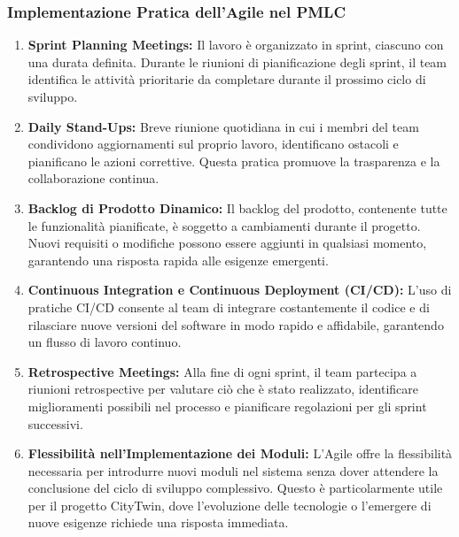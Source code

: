 \subsubsection{Implementazione Pratica dell'Agile nel PMLC}

\begin{enumerate}
    \item \textbf{Sprint Planning Meetings:} Il lavoro è organizzato in sprint, ciascuno con una durata definita. Durante le riunioni di pianificazione degli sprint, il team identifica le attività prioritarie da completare durante il prossimo ciclo di sviluppo.
    
    \item \textbf{Daily Stand-Ups:} Breve riunione quotidiana in cui i membri del team condividono aggiornamenti sul proprio lavoro, identificano ostacoli e pianificano le azioni correttive. Questa pratica promuove la trasparenza e la collaborazione continua.
    
    \item \textbf{Backlog di Prodotto Dinamico:} Il backlog del prodotto, contenente tutte le funzionalità pianificate, è soggetto a cambiamenti durante il progetto. Nuovi requisiti o modifiche possono essere aggiunti in qualsiasi momento, garantendo una risposta rapida alle esigenze emergenti.
    
    \item \textbf{Continuous Integration e Continuous Deployment (CI/CD):} L'uso di pratiche CI/CD consente al team di integrare costantemente il codice e di rilasciare nuove versioni del software in modo rapido e affidabile, garantendo un flusso di lavoro continuo.
    
    \item \textbf{Retrospective Meetings:} Alla fine di ogni sprint, il team partecipa a riunioni retrospective per valutare ciò che è stato realizzato, identificare miglioramenti possibili nel processo e pianificare regolazioni per gli sprint successivi.
    
    \item \textbf{Flessibilità nell'Implementazione dei Moduli:} L'Agile offre la flessibilità necessaria per introdurre nuovi moduli nel sistema senza dover attendere la conclusione del ciclo di sviluppo complessivo. Questo è particolarmente utile per il progetto CityTwin, dove l'evoluzione delle tecnologie o l'emergere di nuove esigenze richiede una risposta immediata.
\end{enumerate}
